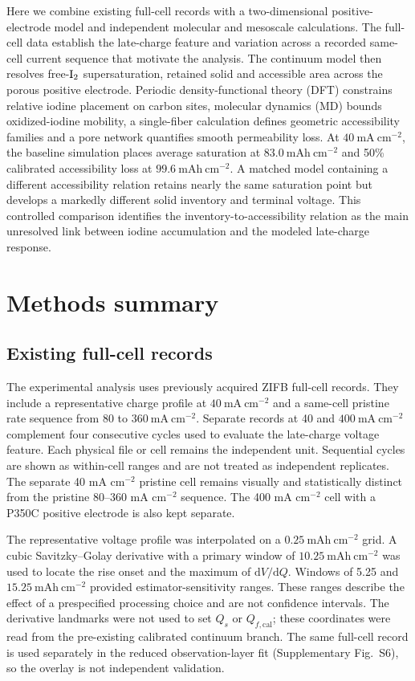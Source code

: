 \documentclass[11pt]{article}
\begin{document}
Here we combine existing full-cell records with a two-dimensional positive-electrode model and independent molecular and mesoscale calculations. The full-cell data establish the late-charge feature and variation across a recorded same-cell current sequence that motivate the analysis. The continuum model then resolves free-$\ce{I2}$ supersaturation, retained solid and accessible area across the porous positive electrode. Periodic density-functional theory (DFT) constrains relative iodine placement on carbon sites, molecular dynamics (MD) bounds oxidized-iodine mobility, a single-fiber calculation defines geometric accessibility families and a pore network quantifies smooth permeability loss. At $40~\mathrm{mA~cm^{-2}}$, the baseline simulation places average saturation at $83.0~\mathrm{mAh~cm^{-2}}$ and 50\% calibrated accessibility loss at $99.6~\mathrm{mAh~cm^{-2}}$. A matched model containing a different accessibility relation retains nearly the same saturation point but develops a markedly different solid inventory and terminal voltage. This controlled comparison identifies the inventory-to-accessibility relation as the main unresolved link between iodine accumulation and the modeled late-charge response.

\section{Methods summary}


\subsection{Existing full-cell records}


The experimental analysis uses previously acquired ZIFB full-cell records. They include a representative charge profile at $40~\mathrm{mA~cm^{-2}}$ and a same-cell pristine rate sequence from 80 to $360~\mathrm{mA~cm^{-2}}$. Separate records at 40 and $400~\mathrm{mA~cm^{-2}}$ complement four consecutive cycles used to evaluate the late-charge voltage feature. Each physical file or cell remains the independent unit. Sequential cycles are shown as within-cell ranges and are not treated as independent replicates. The separate 40 mA cm$^{-2}$ pristine cell remains visually and statistically distinct from the pristine 80--360 mA cm$^{-2}$ sequence. The 400 mA cm$^{-2}$ cell with a P350C positive electrode is also kept separate.

The representative voltage profile was interpolated on a $0.25~\mathrm{mAh~cm^{-2}}$ grid. A cubic Savitzky--Golay derivative \citep{Savitzky1964} with a primary window of $10.25~\mathrm{mAh~cm^{-2}}$ was used to locate the rise onset and the maximum of $\mathrm{d}V/\mathrm{d}Q$. Windows of 5.25 and $15.25~\mathrm{mAh~cm^{-2}}$ provided estimator-sensitivity ranges. These ranges describe the effect of a prespecified processing choice and are not confidence intervals. The derivative landmarks were not used to set $Q_s$ or $Q_{f,\mathrm{cal}}$; these coordinates were read from the pre-existing calibrated continuum branch. The same full-cell record is used separately in the reduced observation-layer fit (Supplementary Fig.~S6), so the overlay is not independent validation.
\end{document}
